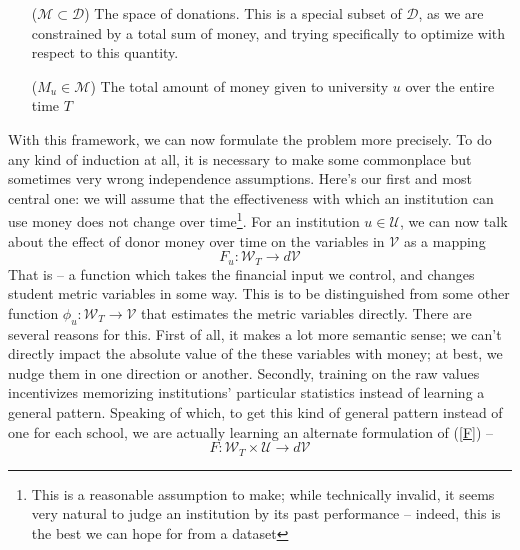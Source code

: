 \documentclass[paper.tex]{subfiles}
\newcommand{\UU}{\mathcal{U}}
\newcommand{\D}{\mathcal{D}}
\newcommand{\V}{\mathcal{V}}
\newcommand{\W}{\mathcal{W}}
\begin{document}
	\begin{itemize}[leftmargin=5em]
		\item[($\mathcal{M} \subset \D$)] The space of donations. This is a special subset of $\D$, as we are constrained by a total sum of money, and trying specifically to optimize with respect to this quantity.
		\item[($M_u \in \mathcal{M}$)] The total amount of money given to university $u$ over the entire time $T$
	\end{itemize}
	
	With this framework, we can now formulate the problem more precisely. To do any kind of induction at all, it is necessary to make some commonplace but sometimes very wrong independence assumptions. Here's our first and most central one: we will assume that the effectiveness with which an institution can use money does not change over time\footnote{This is a reasonable assumption to make; while technically invalid, it seems very natural to judge an institution by its past performance -- indeed, this is the best we can hope for from a dataset}. For an institution $u \in \UU$, we can now talk about the effect of donor money over time on the variables in $\V$ as a mapping
	\begin{equation}
		F_u: \W_T \to d\V \label{F}
	\end{equation} 	
	That is -- a function which takes the financial input we control, and changes student metric variables in some way. This is to be distinguished from some other function $\phi_u: \W_T \to \V$ that estimates the metric variables directly. There are several reasons for this. First of all, it makes a lot more semantic sense; we can't directly impact the absolute value of the these variables with money; at best, we nudge them in one direction or another. Secondly, training on the raw values incentivizes memorizing institutions' particular statistics instead of learning a general pattern. Speaking of which, to get this kind of general pattern instead of one for each school, we are actually learning an alternate formulation of (\ref{F}) -- 
	\[F: \W_T \times \UU \to d\V \]
	
\end{document}
